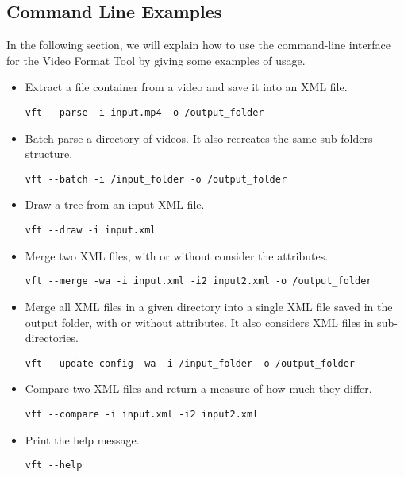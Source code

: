 \subsection{Command Line Examples}

In the following section, we will explain how to use the command-line interface for the Video Format Tool by giving some examples of usage.

\begin{itemize}

\item Extract a file container from a video and save it into an XML file.
\begin{lstlisting}
vft --parse -i input.mp4 -o /output_folder
\end{lstlisting}

\item Batch parse a directory of videos. It also recreates the same sub-folders structure.
\begin{lstlisting}
vft --batch -i /input_folder -o /output_folder
\end{lstlisting}

\item Draw a tree from an input XML file.
\begin{lstlisting}
vft --draw -i input.xml
\end{lstlisting}

\item Merge two XML files, with or without consider the attributes.
\begin{lstlisting}
vft --merge -wa -i input.xml -i2 input2.xml -o /output_folder
\end{lstlisting}

\item Merge all XML files in a given directory into a single XML file saved in the output folder, with or without attributes. It also considers XML files in sub-directories.
\begin{lstlisting}
vft --update-config -wa -i /input_folder -o /output_folder
\end{lstlisting}

\item Compare two XML files and return a measure of how much they differ.
\begin{lstlisting}
vft --compare -i input.xml -i2 input2.xml
\end{lstlisting}

\item Print the help message.
\begin{lstlisting}
vft --help
\end{lstlisting}

\end{itemize}


